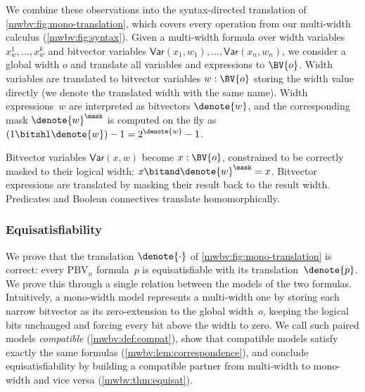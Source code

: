 We combine these observations into the syntax-directed translation
of \cref{mwbv:fig:mono-translation}, which covers every operation
from our multi-width calculus (\cref{mwbv:fig:syntax}).
Given a multi-width formula over width variables $x_w^1, \ldots, x_w^k$ and bitvector variables
$\textsf{Var}(x_1, w_1), \ldots, \textsf{Var}(x_n, w_n)$,
we consider a global width $o$ and translate all variables and expressions to $\BV{o}$.
Width variables are translated to bitvector variables $w : \BV{o}$ storing the
width value directly (we denote the translated width with the same name).
%
Width expressions~$w$ are interpreted as bitvectors $\denote{w}$, and the
corresponding mask $\denote{w}^\mask$ is computed on the fly as
$(1 \bitshl \denote{w}) - 1 = 2^{\denote{w}} - 1$.

Bitvector variables $\textsf{Var}(x, w)$ become $x : \BV{o}$, constrained to be
correctly masked to their logical width: $x \bitand \denote{w}^\mask = x$.
%
Bitvector expressions are translated by masking their result back to the result
width. Predicates and Boolean connectives translate homomorphically.


\subsubsection{Equisatisfiability}\label{mwbv:sec:bounded-proof}

We prove that the translation $\denote{\cdot}$ of \cref{mwbv:fig:mono-translation} is correct:
every $\text{PBV}_n$ formula~$p$ is equisatisfiable with its
translation~$\denote{p}$. We prove this through a single relation between the
models of the two formulas. Intuitively, a mono-width model represents a
multi-width one by storing each narrow bitvector as its zero-extension to the
global width~$o$, keeping the logical bits unchanged and forcing every bit above
the width to zero. We call such paired models \emph{compatible}
(\cref{mwbv:def:compat}), show that compatible models satisfy exactly the same
formulas (\cref{mwbv:lem:correspondence}), and conclude equisatisfiability by
building a compatible partner from multi-width to mono-width and vice versa (\cref{mwbv:thm:equisat}).

